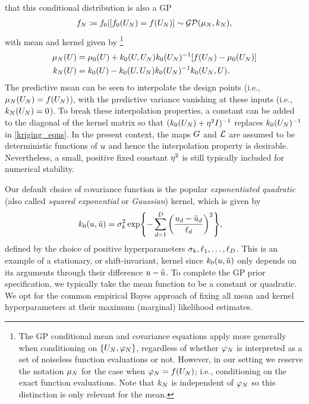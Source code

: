 \documentclass[12pt]{article}
\begin{document}
\citep{gpML} that this conditional distribution is also a GP
\begin{align}
\funcEm[\Ndesign] \Def \funcPrior|[\funcPrior(\designIn)=\func(\designIn)]\sim \GP(\gpMean[\Ndesign], \gpKer[\Ndesign]), \label{generic_gp_conditional}
\end{align}
with mean and kernel given by
\footnote{The GP conditional mean and covariance equations apply more generally when conditioning on 
$\{\designIn[\Ndesign], \funcVal[\Ndesign]\}$, regardless of whether $\funcVal[\Ndesign]$ is interpreted as 
a set of noiseless function evaluations or not. However, in our setting we reserve the notation $\gpMean[\Ndesign]$
for the case when $\funcVal[\Ndesign] = \func(\designIn[\Ndesign])$; i.e., conditioning on the exact function 
evaluations. Note that $\gpKer[\Ndesign]$ is independent of $\funcVal[\Ndesign]$ so this distinction is only 
relevant for the mean.} 
\begin{align}
\gpMean[\Ndesign](\parMat) &= \gpMeanPrior(\parMat) + \gpKerPrior(\parMat, \designIn) \gpKerPrior(\designIn)^{-1} [\func(\designIn) - \gpMeanPrior(\designIn)] \label{kriging_eqns} \\
\gpKer[\Ndesign](\parMat) &= \gpKerPrior(\parMat) - \gpKerPrior(\parMat, \designIn) \gpKerPrior(\designIn)^{-1} \gpKerPrior(\designIn, \parMat). \nonumber
\end{align}
The predictive mean can be seen to interpolate the design points (i.e., $\gpMean[\Ndesign](\designIn) = \func(\designIn[\Ndesign])$), with 
the predictive variance vanishing at these inputs (i.e., $\gpKer[\Ndesign](\designIn) = 0$). To break these interpolation properties,
a constant can be added to the diagonal of the kernel matrix so that $(\gpKerPrior(\designIn) + \nuggetSD^2 I)^{-1}$ replaces 
$\gpKerPrior(\designIn)^{-1}$ in \ref{kriging_eqns}. In the present context, the maps $\fwd$ and $\llik$ are assumed to be deterministic functions 
of $\Par$ and hence the interpolation property is desirable. Nevertheless, a small, positive fixed constant $\nuggetSD^2$ is still 
typically included for numerical stability. 

Our default choice of covariance function is the popular \textit{exponentiated quadratic} 
(also called \textit{squared exponential} or \textit{Gaussian}) kernel, which is given by 
\begin{align}
\gpKerPrior(\Par, \tilde{\Par}) &= 
\margSD^2 \Exp{- \sum_{\idxParDim=1}^{\dimPar} \left(\frac{\Par_{\idxParDim} - \tilde{\Par}_{\idxParDim}}{\lengthscale_{\idxParDim}} \right)^2}, 
\end{align}
defined by the choice of positive hyperparameters $\margSD, \lengthscale_{1}, \dots, \lengthscale_{\dimPar}$. This is an example
of a stationary, or shift-invariant, kernel since $\gpKerPrior(\Par, \tilde{\Par})$ only depends on its arguments through their difference 
$\Par - \tilde{\Par}$. To complete the GP prior specification, we typically take the mean 
function to be a constant or quadratic. We opt for the common empirical Bayes approach of fixing all mean and kernel hyperparameters 
at their maximum (marginal) likelihood estimates.
\end{document}
